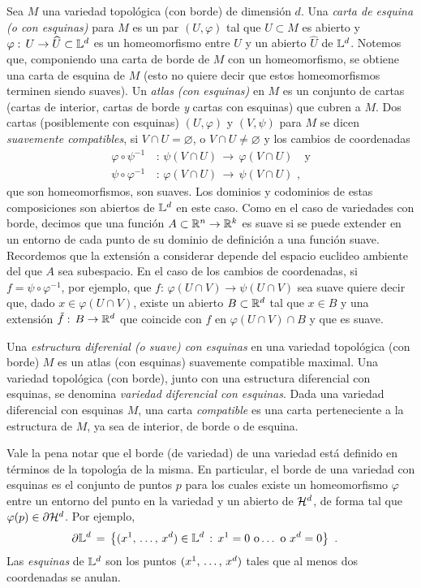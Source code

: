 Sea $M$ una variedad topol\'{o}gica (con borde) de dimensi\'{o}n $d$.
Una \emph{carta de esquina (o con esquinas)} para $M$ es un par
$(U,\varphi)$ tal que $U\subset M$ es abierto y
$\varphi:\,U\rightarrow\widehat{U}\subset\esquina{d}$ es un homeomorfismo
entre $U$ y un abierto $\widehat{U}$ de $\esquina{d}$. Notemos que,
componiendo una carta de borde de $M$ con un homeomorfismo, se obtiene
una carta de esquina de $M$ (esto no quiere decir que estos homeomorfismos
terminen siendo suaves). Un \emph{atlas (con esquinas)} en $M$ es un
conjunto de cartas (cartas de interior, cartas de borde \emph{y} cartas
con esquinas) que cubren a $M$. Dos cartas (posiblemente con esquinas)
$(U,\varphi)$ y $(V,\psi)$ para $M$ se dicen \emph{suavemente compatibles},
si $V\cap U=\varnothing$, o $V\cap U\not=\varnothing$ y los cambios de
coordenadas
\begin{align*}
	\varphi\circ\psi^{-1} & \,:\,\psi(V\cap U)\,\rightarrow\,
		\varphi(V\cap U) \quad\text{y} \\
	\psi\circ\varphi^{-1} & \,:\,\varphi(V\cap U)\,\rightarrow\,
		\psi(V\cap U)
	\text{ ,}
\end{align*}
%
que son homeomorfismos, son suaves. Los dominios y codominios de estas
composiciones son abiertos de $\esquina{d}$ en este caso. Como en el caso
de variedades con borde, decimos que una funci\'{o}n
$A\subset\bb{R}^{n}\rightarrow\bb{R}^{k}$ es suave si se puede extender
en un entorno de cada punto de su dominio de definici\'{o}n a una funci\'{o}n
suave. Recordemos que la extensi\'{o}n a considerar depende del espacio
euclideo ambiente del que $A$ sea subespacio. En el caso de los cambios
de coordenadas, si $f=\psi\circ\varphi^{-1}$, por ejemplo,
que $f:\,\varphi(U\cap V)\rightarrow\psi(U\cap V)$ sea suave quiere decir
que, dado $x\in\varphi(U\cap V)$, existe un abierto $B\subset\bb{R}^{d}$
tal que $x\in B$ y una extensi\'{o}n $\tilde{f}:\,B\rightarrow\bb{R}^{d}$
que coincide con $f$ en $\varphi(U\cap V)\cap B$ y que es suave.

Una \emph{estructura diferenial (o suave) con esquinas} en una variedad
topol\'{o}gica (con borde) $M$ es un atlas (con esquinas) suavemente
compatible maximal. Una variedad topol\'{o}gica (con borde), junto con una
estructura diferencial con esquinas, se denomina \emph{variedad diferencial %
con esquinas}. Dada una variedad diferencial con esquinas $M$, una carta
\emph{compatible} es una carta perteneciente a la estructura de $M$,
ya sea de interior, de borde o de esquina.

Vale la pena notar que el borde (de variedad) de una variedad est\'{a}
definido en t\'{e}rminos de la topolog\'{\i}a de la misma. En particular,
el borde de una variedad con esquinas es el conjunto de puntos $p$ para los
cuales existe un homeomorfismo $\varphi$ entre un entorno del punto en la
variedad y un abierto de $\hemi[d]$, de forma tal que
$\varphi(p)\in\borde[{\hemi[d]}]$. Por ejemplo,
\begin{align*}
	\borde[\esquina{d}] & \,=\,\left\lbrace (\lista*{x}{d})\in
		\esquina{d} \,:\,x^{1}=0\text{ o}\dots\text{ o }x^{d}=0
		\right\rbrace
	\text{ .}
\end{align*}
%
Las \emph{esquinas} de $\esquina{d}$ son los puntos $(\lista*{x}{d})$ tales
que al menos dos coordenadas se anulan.

